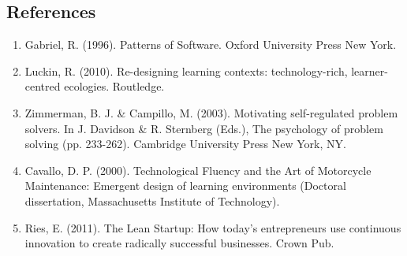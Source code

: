\subsection{References}

\begin{enumerate}
\item
  Gabriel, R. (1996). Patterns of Software. Oxford University Press New
  York.
\item
  Luckin, R. (2010). Re-designing learning contexts: technology-rich,
  learner-centred ecologies. Routledge.
\item
  Zimmerman, B. J. \& Campillo, M. (2003). Motivating self-regulated
  problem solvers. In J. Davidson \& R. Sternberg (Eds.), The psychology
  of problem solving (pp. 233-262). Cambridge University Press New York,
  NY.
\item
  Cavallo, D. P. (2000). Technological Fluency and the Art of Motorcycle
  Maintenance: Emergent design of learning environments (Doctoral
  dissertation, Massachusetts Institute of Technology).
\item
  Ries, E. (2011). The Lean Startup: How today's entrepreneurs use
  continuous innovation to create radically successful businesses. Crown
  Pub.
\end{enumerate}

